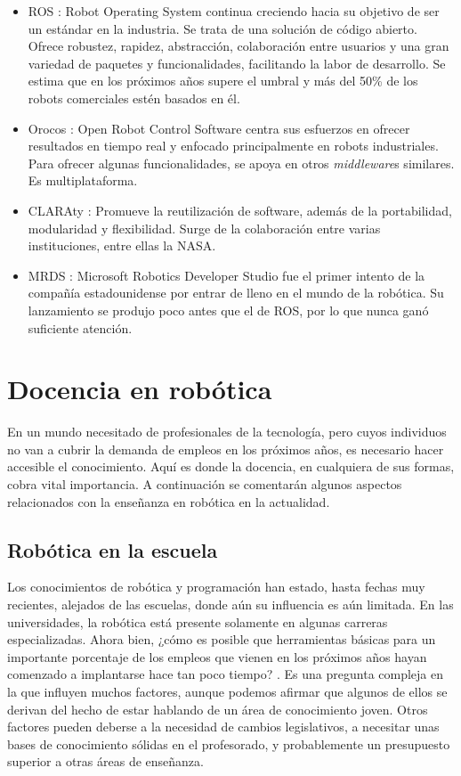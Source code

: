 \documentclass[12pt,spanish,chapterprefix, numbers=noenddot]{book}
\numberwithin{equation}{section}
\numberwithin{figure}{section}
\begin{document}
\begin{itemize}
\item ROS \cite{ros}: Robot Operating System continua creciendo hacia su objetivo de ser un estándar en la industria. Se trata de una solución de código abierto. Ofrece robustez, rapidez, abstracción, colaboración entre usuarios y una gran variedad de paquetes y funcionalidades, facilitando la labor de desarrollo. Se estima que en los próximos años supere el umbral y más del 50\% de los robots comerciales estén basados en él. 
\item Orocos \cite{orocos}: Open Robot Control Software centra sus esfuerzos en ofrecer resultados en tiempo real y enfocado principalmente en robots industriales. Para ofrecer algunas funcionalidades, se apoya en otros \textit{middleware}s similares. Es multiplataforma.  
\item CLARAty \cite{claraty}: Promueve la reutilización de software, además de la portabilidad, modularidad y flexibilidad. Surge de la colaboración entre varias instituciones, entre ellas la NASA.
\item MRDS \cite{mrds}: Microsoft Robotics Developer Studio fue el primer intento de la compañía estadounidense por entrar de lleno en el mundo de la robótica. Su lanzamiento se produjo poco antes que el de ROS, por lo que nunca ganó suficiente atención. 
\end{itemize}

\section{Docencia en robótica}
En un mundo necesitado de profesionales de la tecnología, pero cuyos individuos no van a cubrir la demanda de empleos en los próximos años, es necesario hacer accesible el conocimiento. Aquí es donde la docencia, en cualquiera de sus formas, cobra vital importancia. A continuación se comentarán algunos aspectos relacionados con la enseñanza en robótica en la actualidad. 
\subsection{Robótica en la escuela}
Los conocimientos de robótica y programación han estado, hasta fechas muy recientes, alejados de las escuelas, donde aún su influencia es aún limitada. En las universidades,  la robótica está presente solamente en algunas carreras especializadas. Ahora bien, ¿cómo es posible que herramientas básicas para un importante porcentaje de los empleos que vienen en los próximos años hayan comenzado a implantarse hace tan poco tiempo?  \cite{noticia_estudiantes}. Es una pregunta compleja en la que influyen muchos factores, aunque podemos afirmar que algunos de ellos se derivan del hecho de estar hablando de un área de conocimiento joven. Otros factores pueden deberse a la necesidad de cambios legislativos, a necesitar unas bases de conocimiento sólidas en el profesorado, y probablemente un presupuesto superior a otras áreas de enseñanza. 
\end{document}
